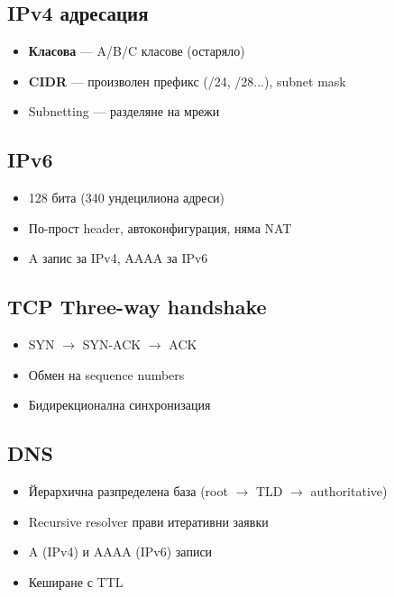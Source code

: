 \documentclass[12pt,a4paper]{article}
\begin{document}
\subsection{IPv4 адресация}
\begin{itemize}
    \item \textbf{Класова} — A/B/C класове (остаряло)
    \item \textbf{CIDR} — произволен префикс (/24, /28...), subnet mask
    \item Subnetting — разделяне на мрежи
\end{itemize}

\subsection{IPv6}
\begin{itemize}
    \item 128 бита (340 ундецилиона адреси)
    \item По-прост header, автоконфигурация, няма NAT
    \item A запис за IPv4, AAAA за IPv6
\end{itemize}

\subsection{TCP Three-way handshake}
\begin{itemize}
    \item SYN $\rightarrow$ SYN-ACK $\rightarrow$ ACK
    \item Обмен на sequence numbers
    \item Бидирекционална синхронизация
\end{itemize}

\subsection{DNS}
\begin{itemize}
    \item Йерархична разпределена база (root $\rightarrow$ TLD $\rightarrow$ authoritative)
    \item Recursive resolver прави итеративни заявки
    \item A (IPv4) и AAAA (IPv6) записи
    \item Кеширане с TTL
\end{itemize}
\end{document}
